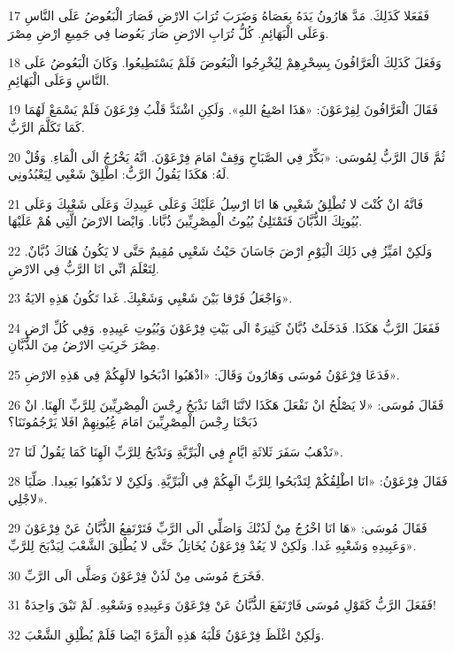 \par 17 فَفَعَلا كَذَلِكَ. مَدَّ هَارُونُ يَدَهُ بِعَصَاهُ وَضَرَبَ تُرَابَ الارْضِ فَصَارَ الْبَعُوضُ عَلَى النَّاسِ وَعَلَى الْبَهَائِمِ. كُلُّ تُرَابِ الارْضِ صَارَ بَعُوضا فِي جَمِيعِ ارْضِ مِصْرَ.
\par 18 وَفَعَلَ كَذَلِكَ الْعَرَّافُونَ بِسِحْرِهِمْ لِيُخْرِجُوا الْبَعُوضَ فَلَمْ يَسْتَطِيعُوا. وَكَانَ الْبَعُوضُ عَلَى النَّاسِ وَعَلَى الْبَهَائِمِ.
\par 19 فَقَالَ الْعَرَّافُونَ لِفِرْعَوْنَ: «هَذَا اصْبِعُ اللهِ». وَلَكِنِ اشْتَدَّ قَلْبُ فِرْعَوْنَ فَلَمْ يَسْمَعْ لَهُمَا كَمَا تَكَلَّمَ الرَّبُّ.
\par 20 ثُمَّ قَالَ الرَّبُّ لِمُوسَى: «بَكِّرْ فِي الصَّبَاحِ وَقِفْ امَامَ فِرْعَوْنَ. انَّهُ يَخْرُجُ الَى الْمَاءِ. وَقُلْ لَهُ: هَكَذَا يَقُولُ الرَّبُّ: اطْلِقْ شَعْبِي لِيَعْبُدُونِي.
\par 21 فَانَّهُ انْ كُنْتَ لا تُطْلِقُ شَعْبِي هَا انَا ارْسِلُ عَلَيْكَ وَعَلَى عَبِيدِكَ وَعَلَى شَعْبِكَ وَعَلَى بُيُوتِكَ الذُّبَّانَ فَتَمْتَلِئُ بُيُوتُ الْمِصْرِيِّينَ ذُبَّانا. وَايْضا الارْضُ الَّتِي هُمْ عَلَيْهَا.
\par 22 وَلَكِنْ امَيِّزُ فِي ذَلِكَ الْيَوْمِ ارْضَ جَاسَانَ حَيْثُ شَعْبِي مُقِيمٌ حَتَّى لا يَكُونُ هُنَاكَ ذُبَّانٌ. لِتَعْلَمَ انِّي انَا الرَّبُّ فِي الارْضِ.
\par 23 وَاجْعَلُ فَرْقا بَيْنَ شَعْبِي وَشَعْبِكَ. غَدا تَكُونُ هَذِهِ الايَةُ».
\par 24 فَفَعَلَ الرَّبُّ هَكَذَا. فَدَخَلَتْ ذُبَّانٌ كَثِيرَةٌ الَى بَيْتِ فِرْعَوْنَ وَبُيُوتِ عَبِيدِهِ. وَفِي كُلِّ ارْضِ مِصْرَ خَرِبَتِ الارْضُ مِنَ الذُّبَّانِ.
\par 25 فَدَعَا فِرْعَوْنُ مُوسَى وَهَارُونَ وَقَالَ: «اذْهَبُوا اذْبَحُوا لالَهِكُمْ فِي هَذِهِ الارْضِ».
\par 26 فَقَالَ مُوسَى: «لا يَصْلُحُ انْ نَفْعَلَ هَكَذَا لانَّنَا انَّمَا نَذْبَحُ رِجْسَ الْمِصْرِيِّينَ لِلرَّبِّ الَهِنَا. انْ ذَبَحْنَا رِجْسَ الْمِصْرِيِّينَ امَامَ عُِيُونِهِمْ افَلا يَرْجُمُونَنَا؟
\par 27 نَذْهَبُ سَفَرَ ثَلاثَةِ ايَّامٍ فِي الْبَرِّيَّةِ وَنَذْبَحُ لِلرَّبِّ الَهِنَا كَمَا يَقُولُ لَنَا».
\par 28 فَقَالَ فِرْعَوْنُ: «انَا اطْلِقُكُمْ لِتَذْبَحُوا لِلرَّبِّ الَهِكُمْ فِي الْبَرِّيَّةِ. وَلَكِنْ لا تَذْهَبُوا بَعِيدا. صَلِّيَا لاجْلِي».
\par 29 فَقَالَ مُوسَى: «هَا انَا اخْرُجُ مِنْ لَدُنْكَ وَاصَلِّي الَى الرَّبِّ فَتَرْتَفِعُ الذُّبَّانُ عَنْ فِرْعَوْنَ وَعَبِيدِهِ وَشَعْبِهِ غَدا. وَلَكِنْ لا يَعُدْ فِرْعَوْنُ يُخَاتِلُ حَتَّى لا يُطْلِقَ الشَّعْبَ لِيَذْبَحَ لِلرَّبِّ».
\par 30 فَخَرَجَ مُوسَى مِنْ لَدُنْ فِرْعَوْنَ وَصَلَّى الَى الرَّبِّ.
\par 31 فَفَعَلَ الرَّبُّ كَقَوْلِ مُوسَى فَارْتَفَعَ الذُّبَّانُ عَنْ فِرْعَوْنَ وَعَبِيدِهِ وَشَعْبِهِ. لَمْ تَبْقَ وَاحِدَةٌ!
\par 32 وَلَكِنْ اغْلَظَ فِرْعَوْنُ قَلْبَهُ هَذِهِ الْمَرَّةَ ايْضا فَلَمْ يُطْلِقِ الشَّعْبَ.

